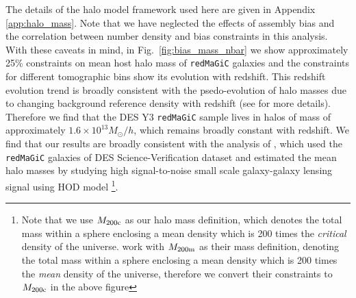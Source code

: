 \documentclass[aps, prd,twocolumn,superscriptaddress,nofootinbib,preprintnumbers]{revtex4-1}
\newcommand{\redmagic}{\texttt{redMaGiC} }
\newcommand{\blue}[1]{\textcolor{blue}{#1}}
\begin{document}
The details of the halo model framework used here are given in Appendix \ref{app:halo_mass}. Note that we have neglected the effects of assembly bias and the correlation between number density and bias constraints in this analysis. With these caveats in mind, in Fig.~\ref{fig:bias_mass_nbar} we show approximately 25\% constraints on mean host halo mass of \redmagic galaxies and the constraints for different tomographic bins show its evolution with redshift. This redshift evolution trend is broadly consistent with the psedo-evolution of halo masses due to changing background reference density with redshift (see \citep{Diemer_2013} for more details). Therefore we find that the DES Y3 \redmagic sample lives in halos of mass of approximately $1.6 \times 10^{13} M_{\odot}/h$, which remains broadly constant with redshift. We find that our results are broadly consistent with the analysis of \citep{Clampitt_2016}, which used the \redmagic galaxies of DES Science-Verification dataset and estimated the mean halo masses by studying high signal-to-noise small scale galaxy-galaxy lensing signal using HOD model \footnote{Note that we use $M_{\rm 200c}$ as our halo mass definition, which denotes the total mass within a sphere enclosing a mean density which is 200 times the \textit{critical} density of the universe. \citet{Clampitt_2016} work with $M_{\rm 200m}$ as their mass definition, denoting the total mass within a sphere enclosing a mean density which is 200 times the \textit{mean} density of the universe, therefore we convert their constraints to $M_{\rm 200c}$ in the above figure}. 




\end{document}

